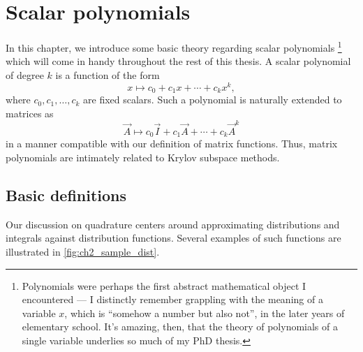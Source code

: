 \chapter{Scalar polynomials}


In this chapter, we introduce some basic theory regarding scalar polynomials%
\footnote{Polynomials were perhaps the first abstract mathematical object I encountered --- I distinctly remember grappling with the meaning of a variable \(x\), which is ``somehow a number but also not'', in the later years of elementary school. It's amazing, then, that the theory of polynomials of a single variable underlies so much of my PhD thesis.}
which will come in handy throughout the rest of this thesis.
A scalar polynomial of degree \( k \) is a function of the form 
\begin{equation*}
    x\mapsto c_0 + c_1 x + \cdots + c_k x^k,
\end{equation*}
where \( c_0, c_1, \ldots, c_k \) are fixed scalars.
Such a polynomial is naturally extended to matrices as
\begin{equation*}
    \vec{A} \mapsto c_0 \vec{I} + c_1 \vec{A} + \cdots + c_k \vec{A}^k
\end{equation*}
in a manner compatible with our definition of matrix functions.
Thus, matrix polynomials are intimately related to Krylov subspace methods.



\section{Basic definitions}

Our discussion on quadrature centers around approximating distributions and integrals against distribution functions. 
Several examples of such functions are illustrated in \cref{fig:ch2_sample_dist}.

